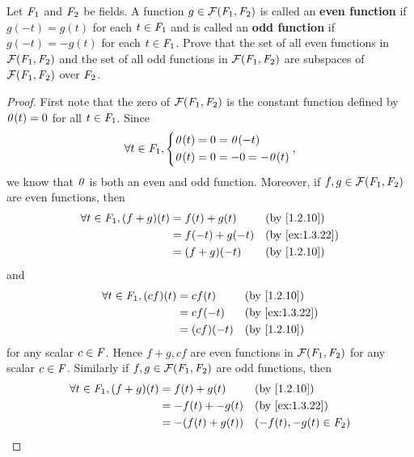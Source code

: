\begin{ex}\label{ex:1.3.22}
  Let \(\mathit{F}_1\) and \(\mathit{F}_2\) be fields.
  A function \(g \in \fs{\F_1}{\F_2}\) is called an \textbf{even function} if \(g(-t) = g(t)\) for each \(t \in \mathit{F}_1\) and is called an \textbf{odd function} if \(g(-t) = -g(t)\) for each \(t \in \mathit{F}_1\).
  Prove that the set of all even functions in \(\fs{\F_1}{\F_2}\) and the set of all odd functions in \(\fs{\F_1}{\F_2}\) are subspaces of \(\fs{\F_1}{\F_2}\) over \(\mathit{F}_2\).
\end{ex}

\begin{proof}
  First note that the zero of \(\fs{\F_1}{\F_2}\) is the constant function defined by \(\mathit{0}(t) = 0\) for all \(t \in \mathit{F}_1\).
  Since
  \[
    \forall t \in \mathit{F}_1, \begin{dcases}
      \mathit{0}(t) = 0 = \mathit{0}(-t) \\
      \mathit{0}(t) = 0 = -0 = -\mathit{0}(t)
    \end{dcases},
  \]
  we know that \(\mathit{0}\) is both an even and odd function.
  Moreover, if \(f, g \in \fs{\F_1}{\F_2}\) are even functions, then
  \begin{align*}
    \forall t \in \F_1, (f + g)(t) & = f(t) + g(t)   &  & \text{(by \cref{1.2.10})}    \\
                                   & = f(-t) + g(-t) &  & \text{(by \cref{ex:1.3.22})} \\
                                   & = (f + g)(-t)   &  & \text{(by \cref{1.2.10})}
  \end{align*}
  and
  \begin{align*}
    \forall t \in \F_1, (cf)(t) & = cf(t)    &  & \text{(by \cref{1.2.10})}    \\
                                & = cf(-t)   &  & \text{(by \cref{ex:1.3.22})} \\
                                & = (cf)(-t) &  & \text{(by \cref{1.2.10})}
  \end{align*}
  for any scalar \(c \in \mathit{F}\).
  Hence \(f + g, cf\) are even functions in \(\fs{\F_1}{\F_2}\) for any scalar \(c \in \mathit{F}\).
  Similarly if \(f, g \in \fs{\F_1}{\F_2}\) are odd functions, then
  \begin{align*}
    \forall t \in \F_1, (f + g)(t) & = f(t) + g(t)    &  & \text{(by \cref{1.2.10})}    \\
                                   & = -f(t) + -g(t)  &  & \text{(by \cref{ex:1.3.22})} \\
                                   & = -(f(t) + g(t)) &  & (-f(t), -g(t) \in \F_2)      \\

\end{align*}
\end{proof}
